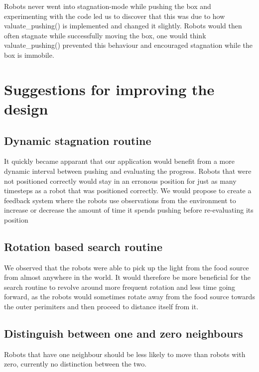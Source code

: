 \documentclass[titlepage,norsk,a4paper,10pt]{article}
\begin{document}
Robots never went into stagnation-mode while pushing the box and experimenting with the code led us to discover that this was due to how valuate\_pushing() is implemented and changed it slightly.
Robots would then often stagnate while successfully moving the box, one would think valuate\_pushing() prevented this behaviour and encouraged stagnation while the box is immobile.



\section{Suggestions for improving the design}

\subsection{Dynamic stagnation routine}
It quickly became apparant that our application would benefit from a more dynamic interval between pushing and evaluating the progress. Robots that were not positioned correctly would stay in an erronous position for just as many timesteps as a robot that was positioned correctly. We would propose to create a feedback system where the robots use observations from the environment to increase or decrease the amount of time it spends pushing before re-evaluating its position

\subsection{Rotation based search routine}
We observed that the robots were able to pick up the light from the food source from almost anywhere in the world. It would therefore be more beneficial for the search routine to revolve around more frequent rotation and less time going forward, as the robots would sometimes rotate away from the food source towards the outer perimiters and then proceed to distance itself from it.

\subsection{Distinguish between one and zero neighbours}
Robots that have one neighbour should be less likely to move than robots with zero, currently no distinction between the two.
\end{document}
